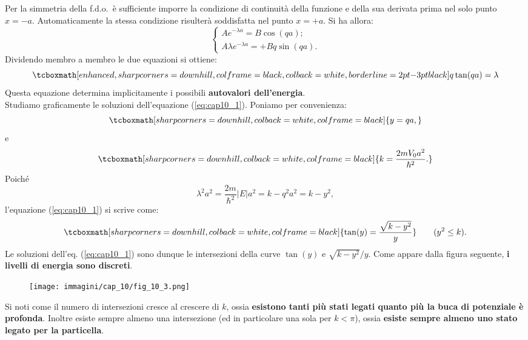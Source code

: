 \documentclass[a4paper,12pt,oneside]{book}
\begin{document}
Per la simmetria della f.d.o.~è sufficiente imporre la condizione di continuità della funzione e della sua derivata prima nel solo punto $x=-a$. Automaticamente la stessa condizione risulterà soddisfatta nel punto $x=+a$. Si ha allora:
	\begin{equation}
		\begin{cases}
		Ae^{-\lambda a} =B\cos(qa) ;\\
		A \lambda e^{-\lambda a} = +Bq \sin(qa).\end{cases} 
	\end{equation}
Dividendo membro a membro le due equazioni si ottiene:
	\begin{equation}
		\tcboxmath[enhanced, sharp corners=downhill, colframe=black, colback=white, borderline={2pt}{-3pt}{black}]{
			q \tan (qa) =\lambda
			}
	\label{eq:cap10_1}
	\end{equation}
Questa equazione determina implicitamente i possibili \textbf{autovalori dell'energia}.\\

Studiamo graficamente le soluzioni dell'equazione (\ref{eq:cap10_1}). Poniamo per convenienza:
	\begin{equation}
		\tcboxmath[sharp corners=downhill, colback=white, colframe=black]{
			y=qa,
			}
	\end{equation}
e
	\begin{equation}
		\tcboxmath[sharp corners=downhill, colback=white, colframe=black]{
		k=\frac{2mV_0 a^2}{\hbar ^2}.
		}
	\end{equation}
Poiché
	\begin{equation}
		\lambda ^2 a^2 = \frac{2m }{\hbar ^2}|E|a^2=k-q^2 a^2 =k-y^2,
	\end{equation}
l'equazione (\ref{eq:cap10_1}) si scrive come:
	\begin{equation}
		\tcboxmath[sharp corners=downhill, colback=white, colframe=black]{
			\tan (y) = \frac{\sqrt{k-y^2}}{y}
			} \qquad (y^2 \leq k).
	\end{equation}
Le soluzioni dell'eq. (\ref{eq:cap10_1}) sono dunque le intersezioni della curve $\tan (y)$ e $\sqrt{k-y^2}/y$. Come appare dalla figura seguente, \textbf{i livelli di energia sono discreti}.
\begin{figure}[!htbp]
\texttt{[image: immagini/cap\_10/fig\_10\_3.png]}
\end{figure}
\newpage

Si noti come il numero di intersezioni cresce al crescere di $k$, ossia \textbf{esistono tanti più stati legati quanto più la buca di potenziale è profonda}. Inoltre esiste sempre almeno una intersezione (ed in particolare una sola per $k<\pi$), ossia \textbf{esiste sempre almeno uno stato legato per la particella}.\\
\end{document}
